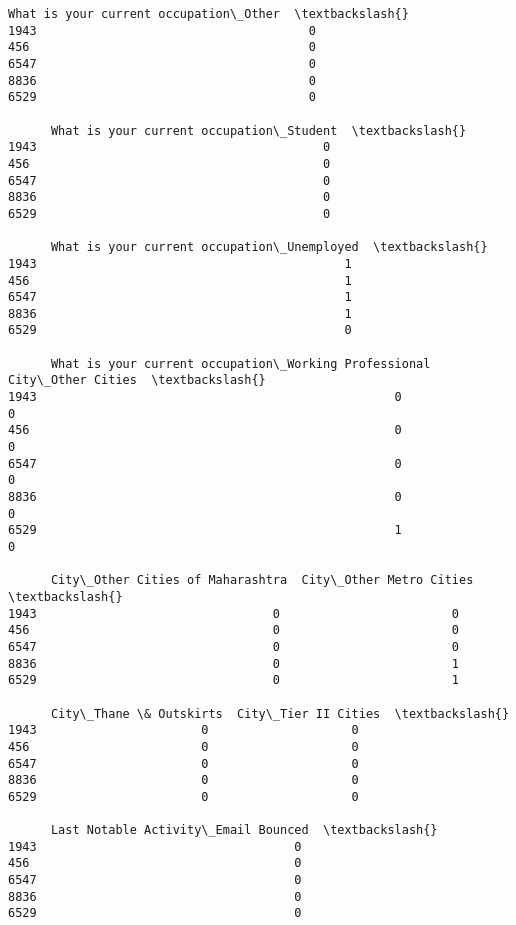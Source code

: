 \documentclass[11pt]{article}
\begin{document}
\begin{tcolorbox}[breakable, size=fbox, boxrule=.5pt, pad at break*=1mm, opacityfill=0]
\begin{Verbatim}[commandchars=\\\{\}]
      What is your current occupation\_Other  \textbackslash{}
1943                                      0
456                                       0
6547                                      0
8836                                      0
6529                                      0

      What is your current occupation\_Student  \textbackslash{}
1943                                        0
456                                         0
6547                                        0
8836                                        0
6529                                        0

      What is your current occupation\_Unemployed  \textbackslash{}
1943                                           1
456                                            1
6547                                           1
8836                                           1
6529                                           0

      What is your current occupation\_Working Professional  City\_Other Cities  \textbackslash{}
1943                                                  0                     0
456                                                   0                     0
6547                                                  0                     0
8836                                                  0                     0
6529                                                  1                     0

      City\_Other Cities of Maharashtra  City\_Other Metro Cities  \textbackslash{}
1943                                 0                        0
456                                  0                        0
6547                                 0                        0
8836                                 0                        1
6529                                 0                        1

      City\_Thane \& Outskirts  City\_Tier II Cities  \textbackslash{}
1943                       0                    0
456                        0                    0
6547                       0                    0
8836                       0                    0
6529                       0                    0

      Last Notable Activity\_Email Bounced  \textbackslash{}
1943                                    0
456                                     0
6547                                    0
8836                                    0
6529                                    0


\end{Verbatim}
\end{tcolorbox}
\end{document}
